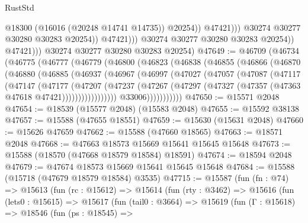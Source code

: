 \begin{lexlean}{RustStd}
\begin{coremodule}
                                    @18300
                                    (@16016 (@20248 @14741 @14735))
                                    @20254))
                                @47421)))
                          @30274
                          @30277
                          @30280
                          @30283
                          @20254))
                      @47421)))
                @30274
                @30277
                @30280
                @30283
                @20254))
            @47421)))
      @30274
      @30277
      @30280
      @30283
      @20254)
@47649 := @46709
    (@46734
      (@46775
        (@46777
          (@46779
            (@46800
              (@46823
                (@46838
                  (@46855
                    (@46866
                      (@46870
                        (@46880
                          (@46885
                            (@46937
                              (@46967
                                (@46997
                                  (@47027
                                    (@47057
                                      (@47087
                                        (@47117
                                          (@47147
                                            (@47177
                                              (@47207
                                                (@47237
                                                  (@47267
                                                    (@47297
                                                      (@47327
                                                        (@47357
                                                          (@47363 @47618 @47421)))))))))))))))))
                          @33006)))))))))))
@47650 := @15571 @2048
@47654 := @18539 (@15577 @2048) (@15583 @2048)
@47655 := @15592 @38138
@47657 := @15588 (@47655 @18551)
@47659 := @15630 (@15631 @2048)
@47660 := @15626 @47659
@47662 := @15588 (@47660 @18565)
@47663 := @18571 @2048
@47668 := @47663 @18573 @15669 @15641 @15645 @15648
@47673 := @15588 (@18570 (@47668 @18579 @18584) @18591)
@47674 := @18594 @2048
@47679 := @47674 @18573 @15669 @15641 @15645 @15648
@47684 := @15588 (@15718 (@47679 @18579 @18584) @3535)
@47715 := @15587
    (fun (fn : @74) =>
    @15613
      (fun (rc : @15612) =>
      @15614
        (fun (rty : @3462) =>
        @15616
          (fun (lets0 : @15615) =>
          @15617
            (fun (tail0 : @3664) =>
            @15619
              (fun (Γ : @15618) =>
              @18546
                (fun (ps : @18545) =>

\end{coremodule}
\end{lexlean}
